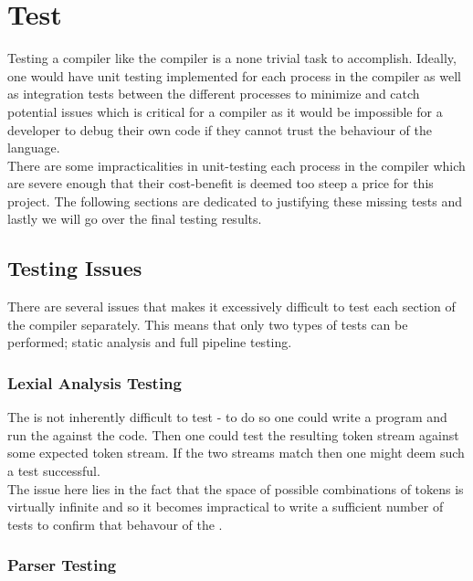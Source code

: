 \section{Test}
\label{sec:Test}

Testing a compiler like the \lang{} compiler is a none trivial task to
accomplish. Ideally, one would have unit testing implemented for each process in the
compiler as well as integration tests between the different processes
to minimize and catch potential issues which is critical for a compiler as it would
be impossible for a developer to debug their own code if they cannot trust the
behaviour of the language. \\

There are some impracticalities in unit-testing each process in the \lang{} compiler
which are severe enough that their cost-benefit is deemed too steep a price for this
project. The following sections are dedicated to justifying these missing tests and
lastly we will go over the final testing results.

\subsection{Testing Issues}

There are several issues that makes it excessively difficult to test each section of
the \lang{} compiler separately. This means that only two types of tests can be
performed; static analysis and full pipeline testing. 

\subsubsection{Lexial Analysis Testing}

The \lexer{} is not inherently difficult to test - to do so one could write a program
and run the \lexer{} against the code. Then one could test the resulting token stream
against some expected token stream. If the two streams match then one might deem
such a test successful. \\

The issue here lies in the fact that the space of possible combinations of tokens is virtually
infinite and so it becomes impractical to write a sufficient number of tests to
confirm that behavour of the \lexer{}.

\subsubsection{Parser Testing}

